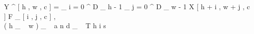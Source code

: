 Y ^ { \prime } [ h , w , c ] = \sum _ { i = 0 } ^ { D _ { h } - 1 } \sum _ { j = 0 } ^ { D _ { w } - 1 } X [ h + i , w + j , c ] \cdot F _ {  } [ i , j , c ] , \\  ( h _ { \ } w ) _ { \ } a n d  _ { \ } T h i s 

